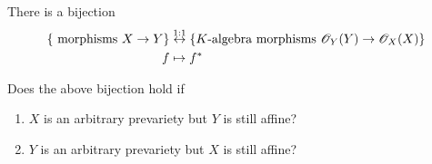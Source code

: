 \begin{proposition}[?]

There is a bijection
\begin{align*}
\left\{{ \text { morphisms } X \rightarrow Y }\right\} 
&\stackrel{1: 1}{\leftrightarrow}
\left\{{  K{\hbox{-}}\text{algebra morphisms } \mathscr{O}_{Y}(Y) \rightarrow \mathscr{O}_{X}(X) }\right\} \\
f &\mapsto f^{*}
\end{align*}

\end{proposition}

\begin{exercise}[Gathmann 5.9]

Does the above bijection hold if

\begin{enumerate}
\def\labelenumi{\alph{enumi}.}
\tightlist
\item
  \(X\) is an arbitrary prevariety but \(Y\) is still affine?
\item
  \(Y\) is an arbitrary prevariety but \(X\) is still affine?
\end{enumerate}

\end{exercise}

\cleardoublepage

\renewcommand{\listtheoremname}{}
\listoftheorems[ignoreall,show={definition}, numwidth=3.5em]
\cleardoublepage

\renewcommand{\listtheoremname}{}
\listoftheorems[ignoreall,show={theorem,proposition}, numwidth=3.5em]
\cleardoublepage

\renewcommand{\listtheoremname}{}
\listoftheorems[ignoreall,show={exercise}, numwidth=3.5em]
\cleardoublepage

\listoffigures
\cleardoublepage


\printbibliography[title=Bibliography]



